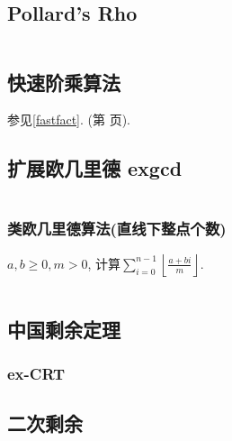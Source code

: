 \documentclass[a4paper, twoside]{article}
\begin{document}
\begin{multicols}{2}
			\subsection{Pollard's Rho}
				\inputminted{cpp}{../src/numbertheory/Pollard-Rho.cpp}
			
			\subsection{快速阶乘算法}
				参见\ref{fastfact}. (第 \pageref{fastfact} 页).



			\subsection{扩展欧几里德 exgcd}
				\inputminted{cpp}{../src/numbertheory/exgcd.cpp}
				

				\subsubsection{类欧几里德算法(直线下整点个数)}
					$a,b \ge 0, m > 0$, 计算$\sum_{i = 0} ^ {n - 1} \left\lfloor \frac {a + bi} m \right\rfloor$.
					\inputminted{cpp}{../src/numbertheory/类欧.cpp}
			
			\subsection{中国剩余定理}
				

				\subsubsection{ex-CRT}
					
			
			\subsection{二次剩余}
				\inputminted{cpp}{../src/numbertheory/二次剩余.cpp}
			
			

\end{multicols}
\end{document}
